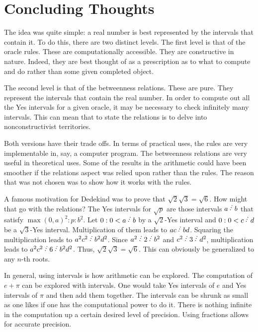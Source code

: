 \documentclass[12pt]{article}
\begin{document}
\section{Concluding Thoughts}

The idea was quite simple: a real number is best represented by the intervals that contain it. To do this, there are two distinct levels. The first level is that of the oracle rules. These are computationally accessible. They are constructive in nature. Indeed, they are best thought of as a prescription as to what to compute and do rather than some given completed object. 

The second level is that of the betweenness relations. These are pure. They represent the intervals that contain the real number. In order to compute out all the Yes intervals for a given oracle, it may be necessary to check infinitely many intervals. This can mean that to state the relations is to delve into nonconstructivist territories. 

Both versions have their trade offs. In terms of practical uses, the rules are very implementable in, say, a computer program. The betweenness relations are very useful in theoretical uses. Some of the results in the arithmetic could have been smoother if the relations aspect was relied upon rather than the rules. The reason that was not chosen was to show how it works with the rules. 

A famous motivation for Dedekind was to prove that $\sqrt{2} \sqrt{3} = \sqrt{6}$. How might that go with the relations? The Yes intervals for $\sqrt{p}$ are those intervals $a \lte b$ that satisfy $\max(0,a)^2 : p : b^2$. Let $0:0 < a \lte b$ by a $\sqrt{2}$-Yes interval and $0:0 < c\lte d$ be a $\sqrt{3}$-Yes interval. Multiplication of them leads to $ac \lte bd$. Squaring the multiplication leads to $a^2 c^2 \lte b^2 d^2$. Since $a^2 \lte 2 \lte b^2$ and $c^2 \lte 3 \lte d^2$, multiplication leads to $a^2 c^2 \lte 6 \lte b^2 d^2$. Thus, $\sqrt{2} \sqrt{3} = \sqrt{6}$. This can obviously be generalized to any $n$-th roots. 

In general, using intervals is how arithmetic can be explored. The computation of $e + \pi$ can be explored with intervals. One would take Yes intervals of $e$ and Yes intervals of $\pi$ and then add them together. The intervals can be shrunk as small as one likes if one has the computational power to do it. There is nothing infinite in the computation up a certain desired level of precision. Using fractions allows for accurate precision. 
\end{document}
